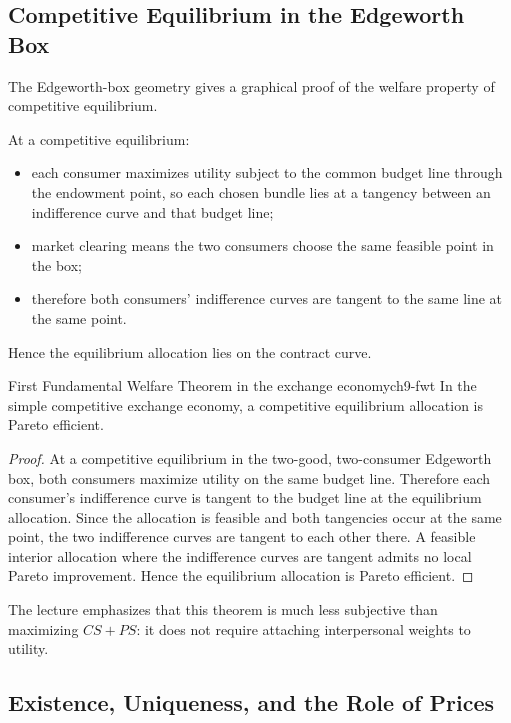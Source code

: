 \subsection{Competitive Equilibrium in the Edgeworth Box}

The Edgeworth-box geometry gives a graphical proof of the welfare property of competitive equilibrium.

At a competitive equilibrium:
\begin{itemize}
    \item each consumer maximizes utility subject to the common budget line through the endowment point, so each chosen bundle lies at a tangency between an indifference curve and that budget line;
    \item market clearing means the two consumers choose the same feasible point in the box;
    \item therefore both consumers' indifference curves are tangent to the same line at the same point.
\end{itemize}

Hence the equilibrium allocation lies on the contract curve.

\begin{theorem}{First Fundamental Welfare Theorem in the exchange economy}{ch9-fwt}
In the simple competitive exchange economy, a competitive equilibrium allocation is Pareto efficient.
\end{theorem}

\begin{proof}
At a competitive equilibrium in the two-good, two-consumer Edgeworth box, both consumers maximize utility on the same budget line. Therefore each consumer's indifference curve is tangent to the budget line at the equilibrium allocation. Since the allocation is feasible and both tangencies occur at the same point, the two indifference curves are tangent to each other there. A feasible interior allocation where the indifference curves are tangent admits no local Pareto improvement. Hence the equilibrium allocation is Pareto efficient.
\end{proof}

The lecture emphasizes that this theorem is much less subjective than maximizing $CS+PS$: it does not require attaching interpersonal weights to utility.

\subsection{Existence, Uniqueness, and the Role of Prices}

